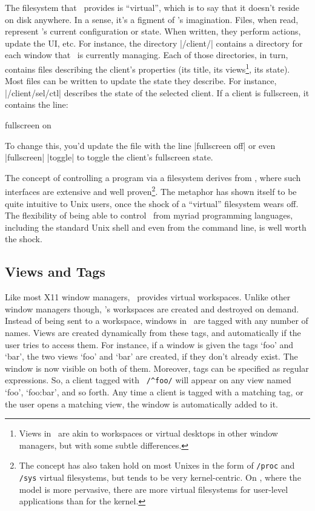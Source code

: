 The filesystem that \wmii\ provides is “virtual”, which is to
say that it doesn't reside on disk anywhere. In a sense, it's a
figment of \wmii's imagination. Files, when read, represent
\wmii's current configuration or state. When written, they
perform actions, update the UI, etc. For instance, the directory
|/client/| contains a directory for each window that \wmii\
is currently managing. Each of those directories, in turn,
contains files describing the client's properties (its title,
its views\footnote{Views in \wmii\ are akin to workspaces or
virtual desktops in other window managers, but with some subtle
differences.}, its state). Most files can be written to update
the state they describe. For instance,
|/client/sel/ctl| describes the state of the selected
client. If a client is fullscreen, it contains the line:

\begin{code}
  fullscreen on
\end{code}

\noindent To change this, you'd update the file with the line
|fullscreen off| or even |fullscreen| |toggle| to toggle
the client's fullscreen state.

The concept of controlling a program via a filesystem derives
from \plannine, where such interfaces are extensive and well
proven\footnote{The concept has also taken hold on most Unixes
in the form of \texttt{/proc} and \texttt{/sys} virtual
filesystems, but tends to be very kernel-centric. On \plannine,
where the model is more pervasive, there are more virtual
filesystems for user-level applications than for the kernel.}.
The metaphor has shown itself to be quite intuitive to Unix
users, once the shock of a “virtual” filesystem wears off.  The
flexibility of being able to control \wmii\ from myriad
programming languages, including the standard Unix shell and
even from the command line, is well worth the shock.

\subsection{Views and Tags}

Like most X11 window managers, \wmii\ provides virtual
workspaces. Unlike other window managers though, \wmii's
workspaces are created and destroyed on demand. Instead of being
sent to a workspace, windows in \wmii\ are tagged with any
number of names. Views are created dynamically from these tags,
and automatically if the user tries to access them.  For
instance, if a window is given the tags ‘foo’ and ‘bar’, the two
views ‘foo’ and ‘bar’ are created, if they don't already exist.
The window is now visible on both of them. Moreover, tags can be
specified as regular expressions. So, a client tagged with {\tt
\verb+/^foo/+} will appear on any view named ‘foo’, ‘foo:bar’,
and so forth. Any time a client is tagged with a matching tag,
or the user opens a matching view, the window is automatically
added to it.

